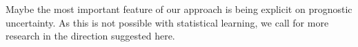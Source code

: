 \documentclass{article}
\begin{document}
Maybe the most important feature of our approach is being explicit on prognostic uncertainty. As this is not possible with statistical learning, we call for more research in the direction suggested here.









\end{document}
